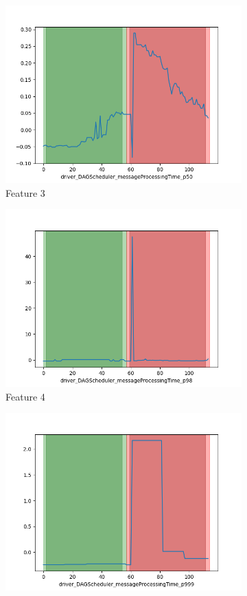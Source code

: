 \documentclass[oneside, a4paper, onecolumn, 11pt]{article}
\begin{document}
\begin{figure}[H]
\begin{subfigure}{0.30\textwidth}
    \centering
    \includegraphics[width=\linewidth]{images/ex3.png}
    \caption{Feature 3}
\end{subfigure}
\begin{subfigure}{0.30\textwidth}
  \centering
  \includegraphics[width=\linewidth]{images/ex4.png}
  \caption{Feature 4}
\end{subfigure}
\begin{subfigure}{0.30\textwidth}
  \centering
  \includegraphics[width=\linewidth]{images/ex5.png}

\end{subfigure}
\end{figure}
\end{document}
